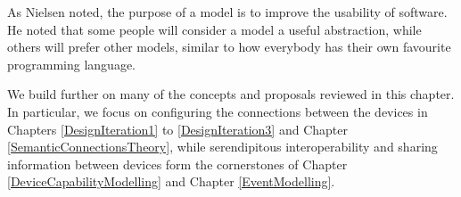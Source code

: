 As Nielsen \cite{Nielsen1986} noted, the purpose of a model is to improve the usability of software. He noted that some people will consider a model a useful abstraction, while others will prefer other models, similar to how everybody has their own favourite programming language.

We build further on many of the concepts and proposals reviewed in this chapter. In particular, we focus on configuring the connections between the devices in Chapters \ref{DesignIteration1} to \ref{DesignIteration3} and Chapter \ref{SemanticConnectionsTheory}, while serendipitous interoperability and sharing information between devices form the cornerstones of Chapter \ref{DeviceCapabilityModelling} and Chapter \ref{EventModelling}. 
